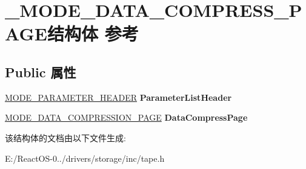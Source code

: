 \hypertarget{struct___m_o_d_e___d_a_t_a___c_o_m_p_r_e_s_s___p_a_g_e}{}\section{\+\_\+\+M\+O\+D\+E\+\_\+\+D\+A\+T\+A\+\_\+\+C\+O\+M\+P\+R\+E\+S\+S\+\_\+\+P\+A\+G\+E结构体 参考}
\label{struct___m_o_d_e___d_a_t_a___c_o_m_p_r_e_s_s___p_a_g_e}
\subsection*{Public 属性}
\begin{DoxyCompactItemize}
\item 
\mbox{\label{struct___m_o_d_e___d_a_t_a___c_o_m_p_r_e_s_s___p_a_g_e_a593badeafc33f4ac1b440734e5bc34a0}} 
\hyperlink{struct___m_o_d_e___p_a_r_a_m_e_t_e_r___h_e_a_d_e_r}{M\+O\+D\+E\+\_\+\+P\+A\+R\+A\+M\+E\+T\+E\+R\+\_\+\+H\+E\+A\+D\+ER} {\bfseries Parameter\+List\+Header}
\item 
\mbox{\label{struct___m_o_d_e___d_a_t_a___c_o_m_p_r_e_s_s___p_a_g_e_a97bad9b85102f73acaee29da76f1015c}} 
\hyperlink{struct___m_o_d_e___d_a_t_a___c_o_m_p_r_e_s_s_i_o_n___p_a_g_e}{M\+O\+D\+E\+\_\+\+D\+A\+T\+A\+\_\+\+C\+O\+M\+P\+R\+E\+S\+S\+I\+O\+N\+\_\+\+P\+A\+GE} {\bfseries Data\+Compress\+Page}
\end{DoxyCompactItemize}


该结构体的文档由以下文件生成\+:\begin{DoxyCompactItemize}
\item 
E\+:/\+React\+O\+S-\/0../drivers/storage/inc/tape.\+h\end{DoxyCompactItemize}
